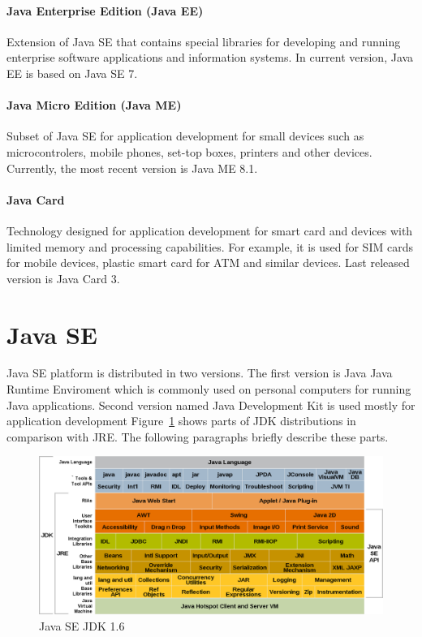 \paragraph{Java Enterprise Edition (Java EE)}
Extension of Java SE that contains special libraries for developing and running enterprise software applications and information systems. In current version, Java EE is based on Java SE 7.

\paragraph{Java Micro Edition (Java ME)}
Subset of Java SE for application development for small devices such as microcontrolers, mobile phones, set-top boxes, printers and other devices. Currently, the most recent version is Java ME 8.1.

\paragraph{Java Card}
Technology designed for application development for smart card and devices with limited memory and processing capabilities. For example, it is used for SIM cards for mobile devices, plastic smart card for ATM and similar devices. Last released version is Java Card 3.

\section{Java SE}\label{JavaSE}
Java SE platform is distributed in two versions. The first version is Java Java Runtime Enviroment which is commonly used on personal computers for running Java applications. Second version named Java Development Kit is used mostly for application development  Figure~\ref{Java6JDK} shows parts of JDK distributions in comparison with JRE. The following paragraphs briefly describe these parts.
\\
\begin{figure}[h!]
    \centering
    \includegraphics[scale=0.35]{fig/java_6_jdk.png}
    \caption{Java SE JDK 1.6 \cite{Java6Doc}}
    \label{Java6JDK}
\end{figure}

